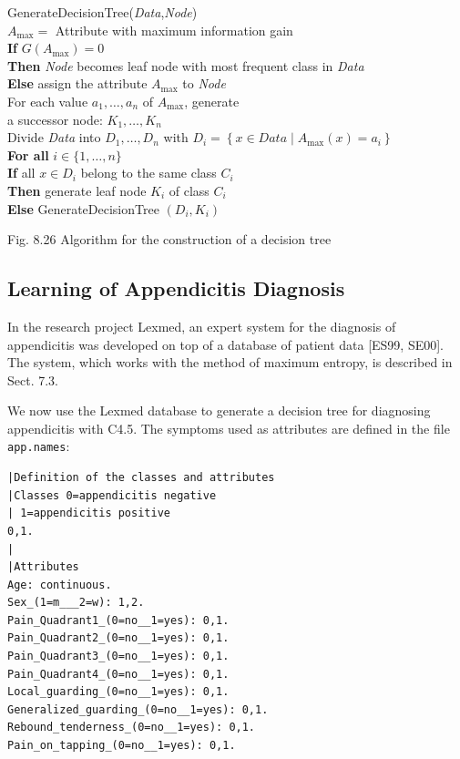 \documentclass[10pt]{book}
\begin{document}
\begin{flushleft}
GenerateDecisionTree(\textit{Data},\textit{Node})\\
$A_{\max}=$ Attribute with maximum information gain\\
\textbf{If} $G(A_{\max})=0$\\
\quad \textbf{Then} \textit{Node} becomes leaf node with most frequent class in \textit{Data}\\
\quad \textbf{Else} assign the attribute $A_{\max}$ to \textit{Node}\\
\qquad For each value $a_{1}, \ldots, a_{n}$ of $A_{\max}$, generate\\
\qquad\quad a successor node: $K_{1}, \ldots, K_{n}$\\
\qquad Divide \textit{Data} into $D_{1}, \ldots, D_{n}$ with $D_{i}=\left\{x \in \textit{Data} \mid A_{\max}(x)=a_{i}\right\}$\\
\qquad \textbf{For all} $i \in \{1, \ldots, n\}$\\
\qquad\quad \textbf{If} all $x \in D_{i}$ belong to the same class $C_{i}$\\
\qquad\quad\quad \textbf{Then} generate leaf node $K_{i}$ of class $C_{i}$\\
\qquad\quad\quad \textbf{Else} GenerateDecisionTree $(D_{i}, K_{i})$
\end{flushleft}

Fig. 8.26 Algorithm for the construction of a decision tree

\subsection{Learning of Appendicitis Diagnosis}
In the research project Lexmed, an expert system for the diagnosis of appendicitis was developed on top of a database of patient data [ES99, SE00]. The system, which works with the method of maximum entropy, is described in Sect. 7.3.

We now use the Lexmed database to generate a decision tree for diagnosing appendicitis with C4.5. The symptoms used as attributes are defined in the file \texttt{app.names}:

\begin{verbatim}
|Definition of the classes and attributes
|Classes 0=appendicitis negative
| 1=appendicitis positive
0,1.
|
|Attributes
Age: continuous.
Sex_(1=m___2=w): 1,2.
Pain_Quadrant1_(0=no__1=yes): 0,1.
Pain_Quadrant2_(0=no__1=yes): 0,1.
Pain_Quadrant3_(0=no__1=yes): 0,1.
Pain_Quadrant4_(0=no__1=yes): 0,1.
Local_guarding_(0=no__1=yes): 0,1.
Generalized_guarding_(0=no__1=yes): 0,1.
Rebound_tenderness_(0=no__1=yes): 0,1.
Pain_on_tapping_(0=no__1=yes): 0,1.
\end{verbatim}
\end{document}
